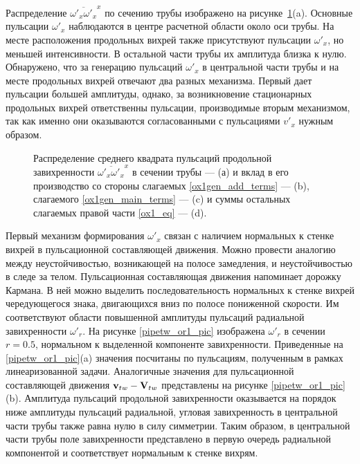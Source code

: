 Распределение $\overline{\omega'_x \omega'_x}^x$ по сечению трубы изображено на рисунке~\ref{ox1gen_pic}(a). Основные пульсации $\omega'_x$ наблюдаются в центре расчетной области около оси трубы. На месте расположения продольных вихрей также присутствуют пульсации $\omega'_x$, но меньшей интенсивности. В остальной части трубы их амплитуда близка к нулю. Обнаружено, что за генерацию пульсаций $\omega'_x$ в центральной части трубы и на месте продольных вихрей отвечают два разных механизма. Первый дает пульсации большей амплитуды, однако, за возникновение стационарных продольных вихрей ответственны пульсации, производимые вторым механизмом, так как именно они оказываются согласованными с пульсациями $v'_x$ нужным образом.


\begin{figure}
\caption{Распределение среднего квадрата пульсаций продольной завихренности $\overline{\omega'_x \omega'_x }^x$ в сечении трубы --- (а) и вклад в его производство со стороны слагаемых \eqref{ox1gen_add_terms} --- (b), слагаемого \eqref{ox1gen_main_terms} --- (c) и суммы остальных слагаемых правой части \eqref{ox1_eq} --- (d).}
\label{ox1gen_pic}
\end{figure}


Первый механизм формирования $\omega'_x$ связан с наличием нормальных к стенке вихрей в пульсационной составляющей движения. Можно провести аналогию между неустойчивостью, возникающей на полосе замедления, и неустойчивостью в следе за телом. Пульсационная составляющая движения напоминает дорожку Кармана. В ней можно выделить последовательность нормальных к стенке вихрей чередующегося знака, двигающихся вниз по полосе пониженной скорости. Им соответствуют области повышенной амплитуды пульсаций радиальной завихренности $\omega'_r$. На рисунке \ref{pipetw_or1_pic} изображена $\omega'_r$ в сечении $r = 0.5$, нормальном к выделенной компоненте завихренности. Приведенные на \ref{pipetw_or1_pic}(a) значения посчитаны по пульсациям, полученным в рамках линеаризованной задачи. Аналогичные значения для пульсационной составляющей движения $\mathbf{v}_{tw} - \mathbf{V}_{tw}$ представлены на рисунке \ref{pipetw_or1_pic}(b). Амплитуда пульсаций продольной завихренности оказывается на порядок ниже амплитуды пульсаций радиальной, угловая завихренность в центральной части трубы также равна нулю в силу симметрии. Таким образом, в центральной части трубы поле завихренности представлено в первую очередь радиальной компонентой и соответствует нормальным к стенке вихрям.

